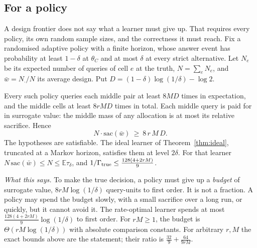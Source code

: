 \subsection{For a policy}

A design frontier does not say what a learner must give up. That requires every policy, its
own random sample sizes, and the correctness it must reach. Fix a randomised adaptive policy
with a finite horizon, whose answer event has probability at least $1-\delta$ at $\theta_{C}$
and at most $\delta$ at every strict alternative. Let $N_{e}$ be its expected number of queries
of cell $e$ at the truth, $N=\sum_{e}N_{e}$, and $\bar w=N_{\cdot}/N$ its average design. Put
$D=(1-\delta)\log(1/\delta)-\log2$.

\begin{theorem}
\label{thm:sacrifice}
Every such policy queries each middle pair at least $8MD$ times in expectation, and the middle
cells at least $8rMD$ times in total. Each middle query is paid for in surrogate value: the
middle mass of any allocation is at most its relative sacrifice. Hence
\[
N\cdot\mathrm{sac}(\bar w)\ \ge\ 8\,r\,M\,D .
\]
The hypotheses are satisfiable. The ideal learner of Theorem~\ref{thm:ideal}, truncated at a
Markov horizon, satisfies them at level $2\delta$. For that learner
$N\,\mathrm{sac}(\bar w)\le N\le\mathbb{E}\tau_{\delta}$, and
$1/\Gamma_{\rm true}\le\frac{128(4+2rM)}{9}$.
\end{theorem}


\emph{What this says.} To make the true decision, a policy must give up a \emph{budget} of
surrogate value, $8rM\log(1/\delta)$ query-units to first order. It is not a fraction. A policy
may spend the budget slowly, with a small sacrifice over a long run, or quickly, but it cannot
avoid it. The rate-optimal learner spends at most $\frac{128(4+2rM)}{9}\log(1/\delta)$ to first
order. For $rM\ge1$, the budget is $\Theta(rM\log(1/\delta))$ with absolute comparison constants.
For arbitrary $r,M$ the exact bounds above are the statement; their ratio is
$\frac{32}{9}+\frac{64}{9rM}$.

